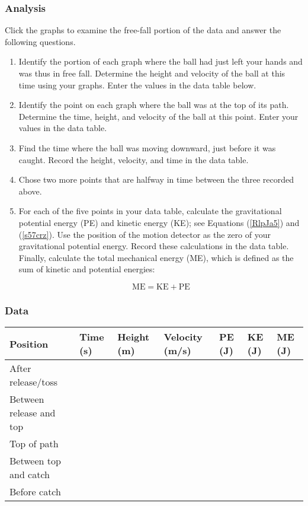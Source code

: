 \documentclass{article}
\begin{document}
\subsubsection*{Analysis}
Click the graphs to examine the free-fall portion of the data and answer the following questions.

\begin{enumerate}
\setlength\itemsep{-1ex}
    \item Identify the portion of each graph where the ball had just left your hands and was thus in free fall. Determine the height and velocity of the ball at this time using your graphs. Enter the values in the data table below.
    \item Identify the point on each graph where the ball was at the top of its path. Determine the time, height, and velocity of the ball at this point. Enter your values in the data table.
    \item Find the time where the ball was moving downward, just before it was caught. Record the height, velocity, and time in the data table.
    \item Chose two more points that are halfway in time between the three recorded above. 
    \item For each of the five points in your data table, calculate the gravitational potential energy (PE) and kinetic energy (KE); see Equations (\ref{RlpJa5}) and (\ref{s57crz}). Use the position of the motion detector as the zero of your gravitational potential energy. Record these calculations in the data table. Finally, calculate the total mechanical energy (ME), which is defined as the sum of kinetic and potential energies:

    \begin{equation}
        \mathrm{ME} = \mathrm{KE} + \mathrm{PE}
    \end{equation}
\end{enumerate}

\subsubsection*{Data}
\def\mycolwidth{1.55cm}

\vspace{1ex}
\begin{tabular}{|m{4cm}|m{\mycolwidth}|m{\mycolwidth}|m{\mycolwidth}|m{\mycolwidth}|m{\mycolwidth}|m{\mycolwidth}|}
    \hline
    \textbf{Position} & \textbf{Time} (s) & \textbf{Height} (m) & \textbf{Velocity} (m/s) & \textbf{PE} (J) & \textbf{KE} (J) & \textbf{ME} (J)\\
    \hline
    After release/toss & & & & & & \\[0.5ex]
    \hline
    Between release and top & & & & & & \\[0.5ex]
    \hline
    Top of path & & & & & & \\[0.5ex]
    \hline
    Between top and catch & & & & & & \\[0.5ex]
    \hline
    Before catch & & & & & & \\[0.5ex]
    \hline
\end{tabular}
\end{document}
